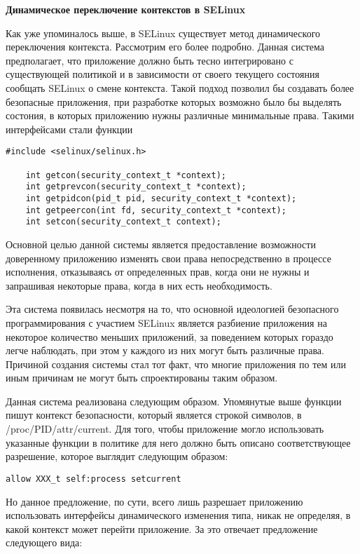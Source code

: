 {\bfseries Динамическое переключение контекстов в SELinux} 

Как уже упоминалось выше, в SELinux существует 
метод динамического переключения контекста. 
Рассмотрим его более подробно. 
Данная система предполагает, что приложение должно быть тесно 
интегрировано с существующей политикой и в зависимости 
от своего текущего состояния сообщать SELinux о смене 
контекста. Такой подход позволил бы создавать более 
безопасные приложения, при разработке которых возможно
было бы выделять состония, в которых приложению нужны
различные минимальные права. Такими интерфейсами стали 
функции 

\bigskip 
\begin{lstlisting} 
#include <selinux/selinux.h>

	int getcon(security_context_t *context);
	int getprevcon(security_context_t *context);
	int getpidcon(pid_t pid, security_context_t *context);
	int getpeercon(int fd, security_context_t *context);
	int setcon(security_context_t context);
\end{lstlisting}

\bigskip 
Основной целью данной системы является предоставление 
возможности доверенному приложению изменять свои права
непосредственно в процессе исполнения, отказываясь от 
определенных прав, когда они не нужны и запрашивая 
некоторые права, когда в них есть необходимость. 

Эта система появилась несмотря на то, что основной 
идеологией безопасного программирования с участием 
SELinux является разбиение приложения на некоторое 
количество меньших приложений, за поведением которых
гораздо легче наблюдать, при этом 
у каждого из них могут быть различные права. Причиной
создания системы стал тот факт, что многие приложения
по тем или иным причинам не могут быть спроектированы
таким образом.

Данная система реализована следующим образом. 
Упомянутые выше функции пишут контекст безопасности, который
является строкой символов, в /proc/PID/attr/current. 
Для того, чтобы приложение могло использовать указанные
функции в политике для него должно быть описано 
соответствующее разрешение, которое выглядит следующим 
образом:

\bigskip
\begin{lstlisting}
allow XXX_t self:process setcurrent
\end{lstlisting}

\bigskip
Но данное предложение, по сути, всего лишь разрешает
приложению использовать интерфейсы динамического изменения 
типа, никак не определяя, в какой контекст может перейти 
приложение. За это отвечает предложение следующего вида: 

